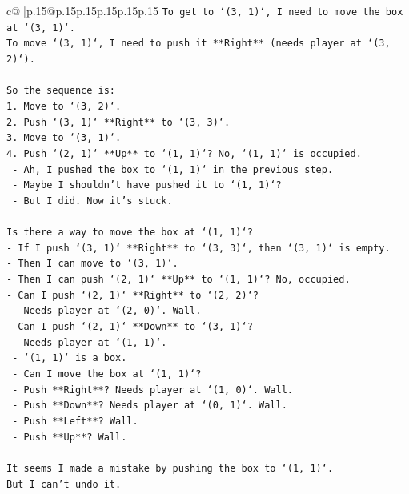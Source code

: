 \documentclass{article}
\begin{document}
{\begin{supertabular}{c@{$\;$}|p{.15\linewidth}@{}p{.15\linewidth}p{.15\linewidth}p{.15\linewidth}p{.15\linewidth}p{.15\linewidth}}
{{{\texttt{To get to `(3, 1)`, I need to move the box at `(3, 1)`.} \\
\texttt{To move `(3, 1)`, I need to push it **Right** (needs player at `(3, 2)`).} \\
\\ 
\texttt{So the sequence is:} \\
\texttt{1. Move to `(3, 2)`.} \\
\texttt{2. Push `(3, 1)` **Right** to `(3, 3)`.} \\
\texttt{3. Move to `(3, 1)`.} \\
\texttt{4. Push `(2, 1)` **Up** to `(1, 1)`? No, `(1, 1)` is occupied.} \\
\texttt{   {-} Ah, I pushed the box to `(1, 1)` in the previous step.} \\
\texttt{   {-} Maybe I shouldn't have pushed it to `(1, 1)`?} \\
\texttt{   {-} But I did. Now it's stuck.} \\
\\ 
\texttt{Is there a way to move the box at `(1, 1)`?} \\
\texttt{{-} If I push `(3, 1)` **Right** to `(3, 3)`, then `(3, 1)` is empty.} \\
\texttt{{-} Then I can move to `(3, 1)`.} \\
\texttt{{-} Then I can push `(2, 1)` **Up** to `(1, 1)`? No, occupied.} \\
\texttt{{-} Can I push `(2, 1)` **Right** to `(2, 2)`?} \\
\texttt{  {-} Needs player at `(2, 0)`. Wall.} \\
\texttt{{-} Can I push `(2, 1)` **Down** to `(3, 1)`?} \\
\texttt{  {-} Needs player at `(1, 1)`.} \\
\texttt{  {-} `(1, 1)` is a box.} \\
\texttt{  {-} Can I move the box at `(1, 1)`?} \\
\texttt{    {-} Push **Right**? Needs player at `(1, 0)`. Wall.} \\
\texttt{    {-} Push **Down**? Needs player at `(0, 1)`. Wall.} \\
\texttt{    {-} Push **Left**? Wall.} \\
\texttt{    {-} Push **Up**? Wall.} \\
\\ 
\texttt{It seems I made a mistake by pushing the box to `(1, 1)`.} \\
\texttt{But I can't undo it.} \\
}}}
\end{supertabular}}
\end{document}

